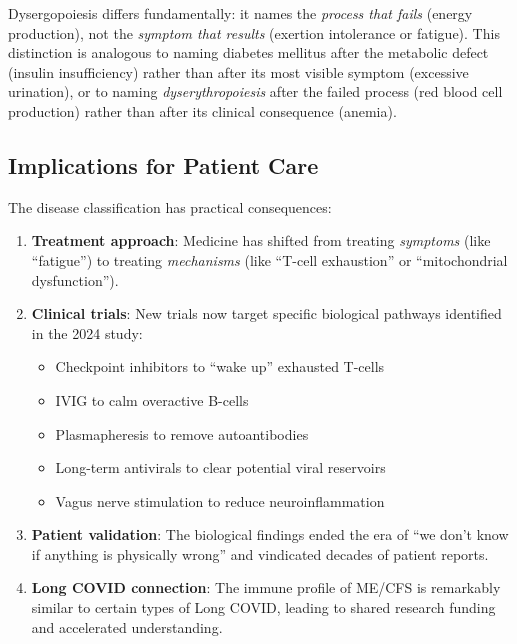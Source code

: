 Dysergopoiesis differs fundamentally: it names the \emph{process that fails} (energy production), not the \emph{symptom that results} (exertion intolerance or fatigue). This distinction is analogous to naming diabetes mellitus after the metabolic defect (insulin insufficiency) rather than after its most visible symptom (excessive urination), or to naming \emph{dyserythropoiesis} after the failed process (red blood cell production) rather than after its clinical consequence (anemia).

\subsection{Implications for Patient Care}
\label{subsec:care-implications}

The disease classification has practical consequences:

\begin{enumerate}
    \item \textbf{Treatment approach}: Medicine has shifted from treating \emph{symptoms} (like ``fatigue'') to treating \emph{mechanisms} (like ``T-cell exhaustion'' or ``mitochondrial dysfunction'').

    \item \textbf{Clinical trials}: New trials now target specific biological pathways identified in the 2024 study:
    \begin{itemize}
        \item Checkpoint inhibitors to ``wake up'' exhausted T-cells
        \item IVIG to calm overactive B-cells
        \item Plasmapheresis to remove autoantibodies
        \item Long-term antivirals to clear potential viral reservoirs
        \item Vagus nerve stimulation to reduce neuroinflammation
    \end{itemize}

    \item \textbf{Patient validation}: The biological findings ended the era of ``we don't know if anything is physically wrong'' and vindicated decades of patient reports.

    \item \textbf{Long COVID connection}: The immune profile of ME/CFS is remarkably similar to certain types of Long COVID, leading to shared research funding and accelerated understanding.
\end{enumerate}

